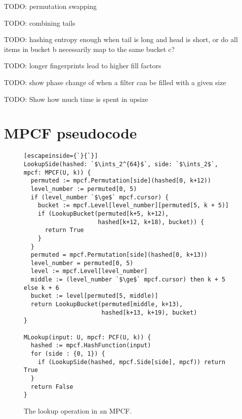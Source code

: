 \documentclass[letterpaper, 11pt]{article}
\newcommand{\ints}{\mathbb{Z}}
\begin{document}
TODO: permutation swapping

TODO: combining tails

TODO: hashing entropy enough when tail is long and head is short, or do all items in bucket b necessarily map to the same bucket c?

TODO: longer fingerprints lead to higher fill factors

TODO: show phase change of when a filter can be filled with a given size

TODO: Show how much time is spent in upsize






\appendix
\section{MPCF pseudocode}

\begin{figure}
\begin{lstlisting}[escapeinside={`}{`}]
LookupSide(hashed: `$\ints_2^{64}$`, side: `$\ints_2$`, mpcf: MPCF(U, k)) {
  permuted := mpcf.Permutation[side](hashed[0, k+12))
  level_number := permuted[0, 5)
  if (level_number `$\ge$` mpcf.cursor) {
    bucket := mpcf.Level[level_number][permuted[5, k + 5)]
    if (LookupBucket(permuted[k+5, k+12),
                     hashed[k+12, k+18), bucket)) {
      return True
    }
  }
  permuted = mpcf.Permutation[side](hashed[0, k+13))
  level_number = permuted[0, 5)
  level := mpcf.Level[level_number]
  middle := (level_number `$\ge$` mpcf.cursor) then k + 5 else k + 6
  bucket := level[permuted[5, middle)]
  return LookupBucket(permuted[middle, k+13),
                      hashed[k+13, k+19), bucket)
}

MLookup(input: U, mpcf: PCF(U, k)) {
  hashed := mpcf.HashFunction(input)
  for (side : {0, 1}) {
    if (LookupSide(hashed, mpcf.Side[side], mpcf)) return True
  }
  return False
}
\end{lstlisting}
\caption{The lookup operation in an MPCF.}
\end{figure}
\end{document}
